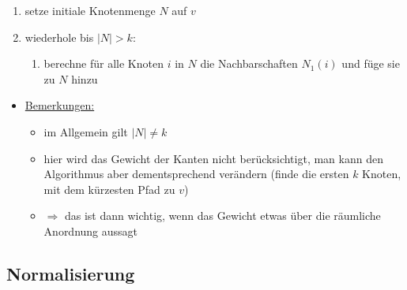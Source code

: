 \begin{enumerate}
  \item setze initiale Knotenmenge $N$ auf $v$
  \item wiederhole bis $|N| > k$:
    \begin{enumerate}
      \item berechne für alle Knoten $i$ in $N$ die Nachbarschaften $N_1(i)$ und füge sie zu $N$ hinzu
    \end{enumerate}
\end{enumerate}

\begin{itemize}
  \item \underline{Bemerkungen:}
  \begin{itemize}
    \item im Allgemein gilt $|N| \neq k$
    \item hier wird das Gewicht der Kanten nicht berücksichtigt, man kann den Algorithmus aber dementsprechend verändern (finde die ersten $k$ Knoten, mit dem kürzesten Pfad zu $v$)
    \item $\Rightarrow$ das ist dann wichtig, wenn das Gewicht etwas über die räumliche Anordnung aussagt
  \end{itemize}
\end{itemize}

\subsection{Normalisierung}

